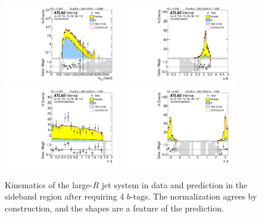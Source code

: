 \begin{figure}[htbp!]
\begin{center}
\includegraphics[width=0.45\textwidth,angle=-90]{figures/boosted/Sideband/b77_FourTag_Sideband_mHH_l_1.pdf}
\includegraphics[width=0.45\textwidth,angle=-90]{figures/boosted/Sideband/b77_FourTag_Sideband_hCandDr.pdf}\\
\includegraphics[width=0.45\textwidth,angle=-90]{figures/boosted/Sideband/b77_FourTag_Sideband_hCandDeta.pdf}
\includegraphics[width=0.45\textwidth,angle=-90]{figures/boosted/Sideband/b77_FourTag_Sideband_hCandDphi.pdf}
  \caption{Kinematics of the large-$R$ jet system in data and prediction in the sideband region after requiring 4 $b$-tags. The normalization agrees by construction, and the shapes are a feature of the prediction. }
  \label{fig:boosted-4b-sideband-ak10-system}
\end{center}
\end{figure}

